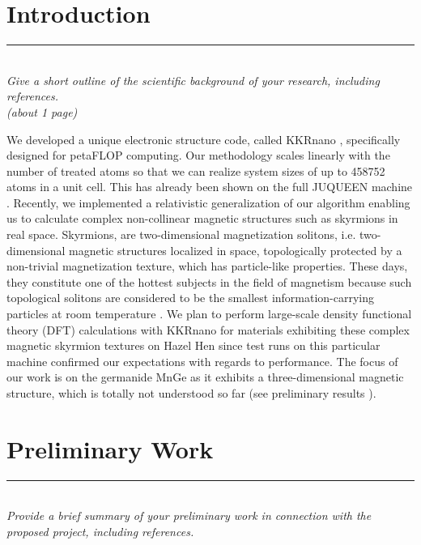 \documentclass [a4paper, 12pt]{article}
\begin{document}
\newpage

\vfill
\tableofcontents
\vfill

\newpage



\section{Introduction}
\rule{\textwidth}{0.4pt}\\
\textit{Give a short outline of the scientific background of your research, including references.}\\

\textit{(about 1 page)}

We developed a unique electronic structure code, called KKRnano \cite{zeller_towards_2008,thiess_massively_2012},
specifically designed for petaFLOP computing. Our methodology scales linearly
with the number of treated atoms so that we can realize system sizes of up to 
458752  atoms in a unit cell. This has already been shown on the full JUQUEEN
machine \cite{brommel_juqueen_2017}. Recently, we implemented a relativistic generalization of our algorithm 
enabling us to calculate complex non-collinear magnetic structures such as skyrmions
in real space. Skyrmions, are two-dimensional magnetization solitons, i.e. two-dimensional
magnetic structures localized in space, topologically protected by a non-trivial
magnetization texture, which has particle-like properties. 
These days, they constitute one of the hottest subjects in the field of 
magnetism because such topological solitons are considered to be the smallest 
information-carrying particles at room temperature \cite{fert_skyrmions_2013}.  
We plan to perform large-scale density functional theory (DFT) calculations with 
KKRnano for materials exhibiting these complex magnetic skyrmion textures on Hazel Hen 
since test runs on this particular machine confirmed our expectations with regards to performance. 
The focus of our work is on the germanide MnGe as it exhibits a three-dimensional magnetic structure,
which is totally not understood so far (see preliminary results
\cite{tanigaki_real-space_2015,bornemann_investigation_2017}).

\section{Preliminary Work}
\rule{\textwidth}{0.4pt}\\
\textit{Provide a brief summary of your preliminary work in connection with the proposed project, including references.}\\
\end{document}
